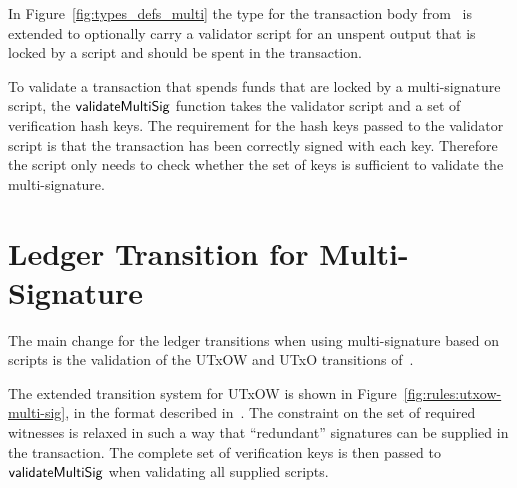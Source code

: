 \documentclass[11pt,a4paper,dvipsnames]{article}
\theoremstyle{definition}
\begin{document}
In Figure~\ref{fig:types_defs_multi} the type for the transaction body
from~\cite{shelley_formal_spec} is extended to optionally carry a validator
script for an unspent output that is locked by a script and should be spent in
the transaction.

To validate a transaction that spends funds that are locked by a multi-signature
script, the $\mathsf{validateMultiSig}$ function takes the validator script and a
set of verification hash keys. The requirement for the hash keys passed to the
validator script is that the transaction has been correctly signed with each
key. Therefore the script only needs to check whether the set of keys is
sufficient to validate the multi-signature.

\section{Ledger Transition for Multi-Signature}
\label{sec:ledg-trans-multi}

The main change for the ledger transitions when using multi-signature based on
scripts is the validation of the UTxOW and UTxO transitions
of~\cite{shelley_formal_spec}.

The extended transition system for UTxOW is shown in
Figure~\ref{fig:rules:utxow-multi-sig}, in the format described
in~\cite{small_step_semantics}. The constraint on the set of required witnesses
is relaxed in such a way that ``redundant'' signatures can be supplied in the
transaction. The complete set of verification keys is then passed to
$\mathsf{validateMultiSig}$ when validating all supplied scripts.
\end{document}
